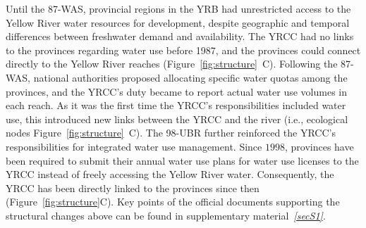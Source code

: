 \documentclass[preprint, 12pt]{elsarticle}
\begin{document}
Until the 87-WAS, provincial regions in the YRB had unrestricted access to the Yellow River water resources for development, despite geographic and temporal differences between freshwater demand and availability.
The YRCC had no links to the provinces regarding water use before 1987, and the provinces could connect directly to the Yellow River reaches (Figure~\ref{fig:structure}~C).
Following the 87-WAS, national authorities proposed allocating specific water quotas among the provinces, and the YRCC's duty became to report actual water use volumes in each reach.
As it was the first time the YRCC's responsibilities included water use, this introduced new links between the YRCC and the river (i.e., ecological nodes Figure~\ref{fig:structure}~C).
The 98-UBR further reinforced the YRCC's responsibilities for integrated water use management.
Since $1998$, provinces have been required to submit their annual water use plans for water use licenses to the YRCC instead of freely accessing the Yellow River water.
Consequently, the YRCC has been directly linked to the provinces since then (Figure~\ref{fig:structure}C).
Key points of the official documents supporting the structural changes above can be found in supplementary material~\textit{\ref{secS1}}.
\end{document}
